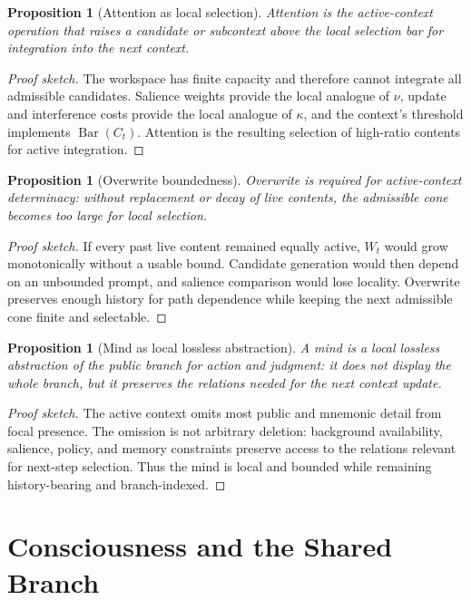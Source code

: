 \documentclass[11pt]{article}
\theoremstyle{plain}
\newtheorem{proposition}[theorem]{Proposition}
\theoremstyle{definition}
\theoremstyle{remark}
\newenvironment{proofsketch}{\begin{proof}[Proof sketch]}{\end{proof}}
\newcommand{\SelBar}{\operatorname{Bar}}
\begin{document}
\begin{proposition}[Attention as local selection]
Attention is the active-context operation that raises a candidate or subcontext above the local selection bar for integration into the next context.
\end{proposition}

\begin{proofsketch}
The workspace has finite capacity and therefore cannot integrate all admissible candidates. Salience weights provide the local analogue of \(\nu\), update and interference costs provide the local analogue of \(\kappa\), and the context's threshold implements \(\SelBar(C_t)\). Attention is the resulting selection of high-ratio contents for active integration.
\end{proofsketch}

\begin{proposition}[Overwrite boundedness]
Overwrite is required for active-context determinacy: without replacement or decay of live contents, the admissible cone becomes too large for local selection.
\end{proposition}

\begin{proofsketch}
If every past live content remained equally active, \(W_t\) would grow monotonically without a usable bound. Candidate generation would then depend on an unbounded prompt, and salience comparison would lose locality. Overwrite preserves enough history for path dependence while keeping the next admissible cone finite and selectable.
\end{proofsketch}

\begin{proposition}[Mind as local lossless abstraction]
A mind is a local lossless abstraction of the public branch for action and judgment: it does not display the whole branch, but it preserves the relations needed for the next context update.
\end{proposition}

\begin{proofsketch}
The active context omits most public and mnemonic detail from focal presence. The omission is not arbitrary deletion: background availability, salience, policy, and memory constraints preserve access to the relations relevant for next-step selection. Thus the mind is local and bounded while remaining history-bearing and branch-indexed.
\end{proofsketch}

\section{Consciousness and the Shared Branch}
\end{document}
